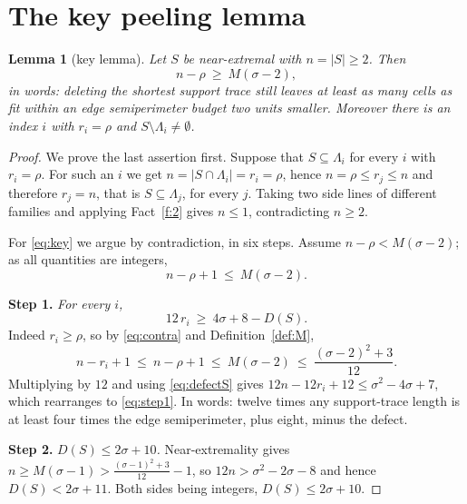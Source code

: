 \documentclass[11pt]{article}
\theoremstyle{plain}
\newtheorem{lemma}[theorem]{Lemma}
\theoremstyle{definition}
\theoremstyle{remark}
\newcommand{\sm}{\setminus}
\begin{document}
\section{The key peeling lemma}\label{sec:key}

\begin{lemma}[key lemma]\label{lem:key}
Let \(S\) be near-extremal with \(n=|S|\ge2\). Then
\begin{equation}\label{eq:key}
   n-\rho\ \ge\ M(\sigma-2) ,
\end{equation}
in words: deleting the shortest support trace still leaves at least as many cells as fit
within an edge semiperimeter budget two units smaller. Moreover there is an index \(i\)
with \(r_{i}=\rho\) and \(S\sm\Lambda_{i}\neq\emptyset\).
\end{lemma}

\begin{proof}
We prove the last assertion first. Suppose that \(S\subseteq\Lambda_{i}\) for every \(i\)
with \(r_{i}=\rho\). For such an \(i\) we get \(n=|S\cap\Lambda_{i}|=r_{i}=\rho\), hence
\(n=\rho\le r_{j}\le n\) and therefore \(r_{j}=n\), that is \(S\subseteq\Lambda_{j}\), for
every \(j\). Taking two side lines of different families and applying Fact~\ref{f:2} gives
\(n\le1\), contradicting \(n\ge2\).

For \eqref{eq:key} we argue by contradiction, in six steps. Assume
\(n-\rho<M(\sigma-2)\); as all quantities are integers,
\begin{equation}\label{eq:contra}
   n-\rho+1\ \le\ M(\sigma-2).
\end{equation}

\medskip\noindent\textbf{Step 1.} \emph{For every \(i\),}
\begin{equation}\label{eq:step1}
   12\,r_{i}\ \ge\ 4\sigma+8-D(S).
\end{equation}
Indeed \(r_{i}\ge\rho\), so by \eqref{eq:contra} and Definition~\ref{def:M},
\[
   n-r_{i}+1\ \le\ n-\rho+1\ \le\ M(\sigma-2)\ \le\ \frac{(\sigma-2)^{2}+3}{12} .
\]
Multiplying by \(12\) and using \eqref{eq:defectS} gives
\(12n-12r_{i}+12\le\sigma^{2}-4\sigma+7\), which rearranges to \eqref{eq:step1}. In words:
twelve times any support-trace length is at least four times the edge semiperimeter, plus
eight, minus the defect.

\medskip\noindent\textbf{Step 2.} \emph{\(D(S)\le2\sigma+10\).}
Near-extremality gives \(n\ge M(\sigma-1)>\frac{(\sigma-1)^{2}+3}{12}-1\), so
\(12n>\sigma^{2}-2\sigma-8\) and hence \(D(S)<2\sigma+11\). Both sides being integers,
\(D(S)\le2\sigma+10\).


\end{proof}
\end{document}
